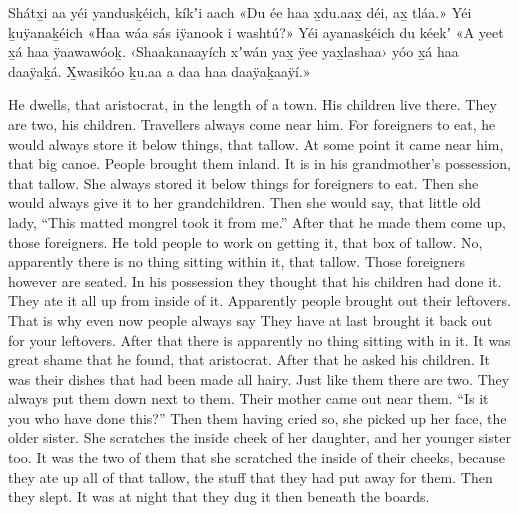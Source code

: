 \begin{pairs}
\begin{Leftside}
Shát\-x̱i aa yéi yandusḵéich, kíkʼi aach
«\!Du ée haa x̱du.aax̱ déi, ax̱ tláa.\!»
Yéi ḵuÿanaḵéich
«\!Haa wáa sás iÿanook i washtú?\!»
Yéi ayanasḵéich du kéekʼ
«\!A yeet x̱á haa ÿaawa\-wóoḵ.
‹\!Shaakanaayích xʼwán yax̱ ÿee yax̱la\-shaa\!›
yóo x̱á haa daaÿaḵá.
X̱wasikóo ḵu.aa a daa haa daaÿaḵaaÿí.\!»
\pend
\pstart
\pend
\endnumbering
\end{Leftside}
\begin{Rightside}
\beginnumbering
\pstart
\noindent
{}He dwells, that aristocrat, in the length of a town.
His children live there.
They are two, his children.
Travellers always come near him.
For foreigners to eat, he would always store it below things, that tallow.
At some point it came near him, that big canoe.
People brought them inland.
It is in his grandmother’s possession, that tallow.
She always stored it below things for foreigners to eat.
Then she would always give it to her grandchildren.
Then she would say, that little old lady,
\qqk{}“This matted mongrel took it from me.”
\pend
\pstart
{}After that he made them come up, those foreigners.
He told people to work on getting it, that box of tallow.
No, apparently there is no thing sitting within it, that tallow.
Those foreigners however are seated.
In his possession they thought that his children had done it.
They ate it all up from inside of it.
Apparently people brought out their leftovers.
That is why even now people always say
They have at last brought it back out for your leftovers.
After that there is apparently no thing sitting with in it.
It was great shame that he found, that aristocrat.
After that he asked his children.
It was their dishes that had been made all hairy.
Just like them there are two.
They always put them down next to them.
Their mother came out near them.
\qqk{}“Is it you who have done this?”
Then them having cried so, she picked up her face, the older sister.
She scratches the inside cheek of her daughter, and her younger sister too.
It was the two of them that she scratched the inside of their cheeks, because they ate up all of that tallow, the stuff that they had put away for them.
Then they slept.
It was at night that they dug it then beneath the boards.

\end{Rightside}
\end{pairs}
